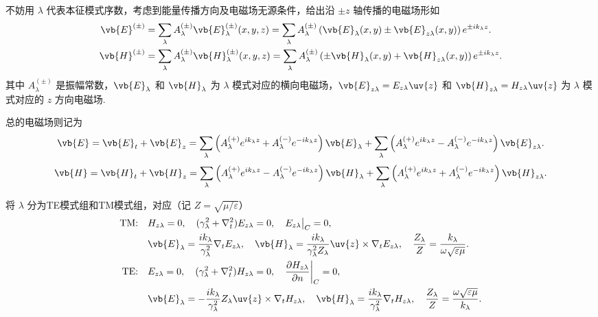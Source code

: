 不妨用 \(\lambda\) 代表本征模式序数，考虑到能量传播方向及电磁场无源条件，给出沿 \(\pm z\) 轴传播的电磁场形如
\begin{align*}
	\vb{E}^{(\pm)} &= \sum_{\lambda} A_{\lambda}^{(\pm)} \vb{E}_{\lambda}^{(\pm)}(x, y, z) = \sum_{\lambda} A_{\lambda}^{(\pm)} \left( \vb{E}_{\lambda}(x, y) \pm \vb{E}_{z\lambda}(x, y) \right) e^{\pm i k_{\lambda} z}.\\
	\vb{H}^{(\pm)} &= \sum_{\lambda} A_{\lambda}^{(\pm)} \vb{H}_{\lambda}^{(\pm)}(x, y, z) = \sum_{\lambda} A_{\lambda}^{(\pm)} \left( \pm \vb{H}_{\lambda}(x, y) + \vb{H}_{z\lambda}(x, y) \right) e^{\pm i k_{\lambda} z}.
\end{align*}
其中 \(A_{\lambda}^{(\pm)}\) 是振幅常数，\(\vb{E}_{\lambda}\) 和 \(\vb{H}_{\lambda}\) 为 \(\lambda\) 模式对应的横向电磁场，\(\vb{E}_{z\lambda} = E_{z\lambda} \uv{z}\) 和 \(\vb{H}_{z\lambda} = H_{z\lambda} \uv{z}\) 为 \(\lambda\) 模式对应的 \(z\) 方向电磁场.

总的电磁场则记为
\begin{align*}
	\vb{E} = \vb{E}_t + \vb{E}_z = \sum_{\lambda} \left( A_{\lambda}^{(+)} e^{i k_{\lambda} z} + A_{\lambda}^{(-)} e^{-i k_{\lambda} z} \right) \vb{E}_{\lambda} + \sum_{\lambda} \left( A_{\lambda}^{(+)} e^{i k_{\lambda} z} - A_{\lambda}^{(-)} e^{-i k_{\lambda} z} \right) \vb{E}_{z\lambda}.
\end{align*}
\begin{align*}
	\vb{H} = \vb{H}_t + \vb{H}_z = \sum_{\lambda} \left( A_{\lambda}^{(+)} e^{i k_{\lambda} z} - A_{\lambda}^{(-)} e^{-i k_{\lambda} z} \right) \vb{H}_{\lambda} + \sum_{\lambda} \left( A_{\lambda}^{(+)} e^{i k_{\lambda} z} + A_{\lambda}^{(-)} e^{-i k_{\lambda} z} \right) \vb{H}_{z\lambda}.
\end{align*}

将 \(\lambda\) 分为TE模式组和TM模式组，对应（记 \(Z = \sqrt{\mu/\varepsilon}\)）
\begin{align*}
	\text{TM:}\quad& H_{z\lambda} = 0,\quad (\gamma_{\lambda}^2 + \nabla_t^2) E_{z\lambda} = 0,\quad E_{z\lambda} \big|_C = 0, \\
	&\vb{E}_{\lambda} = \dfrac{i k_{\lambda}}{\gamma_{\lambda}^2} \nabla_t E_{z\lambda}, \quad \vb{H}_{\lambda} = \dfrac{i k_{\lambda}}{\gamma_{\lambda}^2 Z_{\lambda}} \uv{z} \times \nabla_t E_{z\lambda}, \quad \dfrac{Z_{\lambda}}{Z} = \dfrac{k_{\lambda}}{\omega \sqrt{\varepsilon\mu}}.\\
	\text{TE:}\quad& E_{z\lambda} = 0,\quad (\gamma_{\lambda}^2 + \nabla_t^2) H_{z\lambda} = 0,\quad \dfrac{\partial H_{z\lambda}}{\partial n} \bigg|_C = 0, \\
	&\vb{E}_{\lambda} = -\dfrac{i k_{\lambda}}{\gamma_{\lambda}^2} Z_{\lambda} \uv{z} \times \nabla_t H_{z\lambda}, \quad \vb{H}_{\lambda} = \dfrac{i k_{\lambda}}{\gamma_{\lambda}^2} \nabla_t H_{z\lambda}, \quad \dfrac{Z_{\lambda}}{Z} = \dfrac{\omega \sqrt{\varepsilon\mu}}{k_{\lambda}}.
\end{align*}

